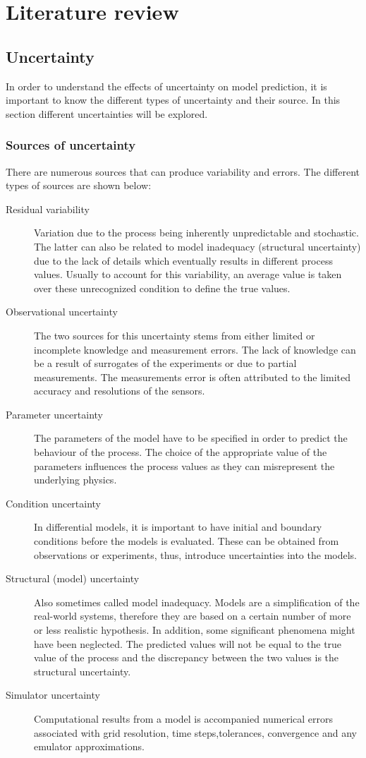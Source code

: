 \chapter{Literature review}
\label{chapterlabel4}

\section{Uncertainty}
In order to understand the effects of uncertainty on model prediction, it is important to know the different types of uncertainty and their source. In this section different  uncertainties will be explored.

\subsection{Sources of uncertainty}
There are numerous sources that can produce variability and errors. The different types of sources are shown below:
\begin{description}
\item[Residual variability] Variation due to the process being inherently unpredictable and stochastic. The latter can also be related to model inadequacy (structural uncertainty) due to the lack of details which eventually results in different process values. Usually to account for this variability, an average value is taken over these unrecognized condition to define the true values.
\item[Observational uncertainty] The two sources for this uncertainty stems from either limited or incomplete knowledge and measurement errors. The lack of knowledge can be a result of surrogates of the experiments or due to partial measurements. The measurements error is often attributed to the limited accuracy and resolutions of the sensors.
\item[Parameter uncertainty] The parameters of the model have to be specified in order to predict the behaviour of the process. The choice of the appropriate value of the parameters influences the process values as they can misrepresent the underlying physics.
\item[Condition uncertainty] In differential models, it is important to have initial and boundary conditions before the models is evaluated. These can be obtained from observations or experiments, thus, introduce uncertainties into the models.
\item[Structural (model) uncertainty] Also sometimes called model inadequacy. Models are a simplification of the real-world systems, therefore they are based on a certain number of more or less realistic hypothesis. In addition, some significant phenomena might have been neglected. The predicted values will not be equal to the true value of the process and the discrepancy between the two values is the structural uncertainty. 
\item[Simulator uncertainty] Computational results from a model is accompanied numerical errors associated with grid resolution, time steps,tolerances, convergence and any emulator approximations.
\end{description}

